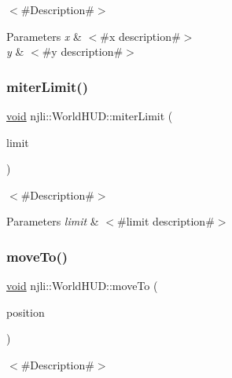 $<$\#\+Description\#$>$


\begin{DoxyParams}{Parameters}
{\em x} & $<$\#x description\#$>$ \\
\hline
{\em y} & $<$\#y description\#$>$ \\
\hline
\end{DoxyParams}
\mbox{\label{classnjli_1_1_world_h_u_d_a7d25dd7849d6f12f614d1382fd00f0c0}} 
\subsubsection{\texorpdfstring{miter\+Limit()}{miterLimit()}}
{\footnotesize\ttfamily \mbox{\hyperlink{_thread_8h_af1e856da2e658414cb2456cb6f7ebc66}{void}} njli\+::\+World\+H\+U\+D\+::miter\+Limit (\begin{DoxyParamCaption}\item[{\mbox{\hyperlink{_util_8h_a5f6906312a689f27d70e9d086649d3fd}{f32}}}]{limit }\end{DoxyParamCaption})}

$<$\#\+Description\#$>$


\begin{DoxyParams}{Parameters}
{\em limit} & $<$\#limit description\#$>$ \\
\hline
\end{DoxyParams}
\mbox{\label{classnjli_1_1_world_h_u_d_ae93e5164ed89c2404f759efba1282383}} 
\subsubsection{\texorpdfstring{move\+To()}{moveTo()}\hspace{0.1cm}{\footnotesize\ttfamily [1/2]}}
{\footnotesize\ttfamily \mbox{\hyperlink{_thread_8h_af1e856da2e658414cb2456cb6f7ebc66}{void}} njli\+::\+World\+H\+U\+D\+::move\+To (\begin{DoxyParamCaption}\item[{const bt\+Vector2 \&}]{position }\end{DoxyParamCaption})}

$<$\#\+Description\#$>$


